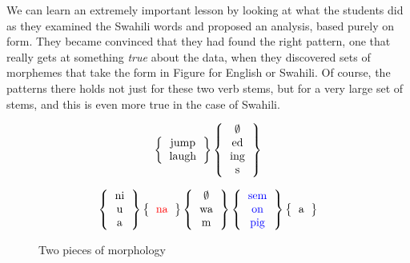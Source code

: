 \documentclass[output=paper,colorlinks,citecolor=brown,
]{langscibook}
\begin{document}
We can learn an extremely important lesson by looking at what the students did as they examined the Swahili words and proposed an analysis, based purely on form. They became convinced that they had found the right pattern, one that really gets at something \textit{true} about the data,  when they discovered sets of morphemes that take the form in Figure  for English or  Swahili. Of course, the patterns there holds not just for these two verb stems, but for a very large set of stems, and this is even more true in the case of Swahili.

\begin{figure}
  \[ \left\{ \begin{tabular}{c} jump \\ laugh  \end{tabular} \right\}  \left\{ \begin{tabular}{c} $\emptyset$ \\ed\\ing\\s \end{tabular}  \right\}
\]

 \[ \left\{ 
\begin{tabular}{c} 
ni \\ u \\ a 
\end{tabular} 
\right\}
\left\{ 
\begin{tabular}{c}
\textcolor{red}{na} 
\end{tabular}  
\right\}  
\left\{ 
\begin{tabular}{c} 
$\emptyset$ \\ wa  \\ m 
\end{tabular} 
\right\} 
\left\{ 
\begin{tabular}{c} 
\textcolor{blue}{sem} \\ \textcolor{blue}{on} \\ \textcolor{blue}{pig}  
\end{tabular}  
\right\}
\left\{ 
\begin{tabular}{c}
a 
\end{tabular}  
\right\} 
\]
\caption{Two pieces of morphology}
\label{morphology}
\end{figure}
 


 
\end{document}
